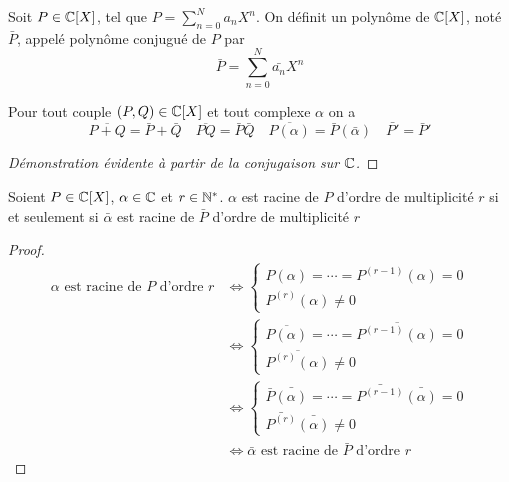 \begin{defdef}
  Soit \(P \in \mathbb{C}[X]\), tel que \(P = \sum_{n = 0}^N a_n X^n\). On définit un
  polynôme de \(\mathbb{C}[X]\), noté \(\bar{P}\), appelé polynôme conjugué de \(P\) par
  \begin{equation}
    \bar{P} = \sum_{n = 0}^N \bar{a_n} X^n
  \end{equation}
\end{defdef}

\begin{prop}
  Pour tout couple \((P,Q) \in \mathbb{C}[X]\) et tout complexe \(\alpha\) on a
  \begin{equation}
    \overline{P+Q} = \bar{P}+\bar{Q} \quad \overline{PQ} = \bar{P}\bar{Q} \quad
    \overline{P(\alpha)} = \bar{P}(\bar{\alpha}) \quad \bar{P'} = \bar{P}'
  \end{equation}
\end{prop}
\begin{proof}[Démonstration évidente à partir de la conjugaison sur \(\mathbb{C}\)]
\end{proof}

\begin{prop}
  Soient \(P \in \mathbb{C}[X]\), \( \alpha \in \mathbb{C}\) et \(r \in \mathbb{N}^*\). \(\alpha\) est
  racine de \(P\) d'ordre de multiplicité \(r\) si et seulement si
  \(\bar{\alpha}\) est racine de \(\bar{P}\) d'ordre de multiplicité \(r\)
\end{prop}
\begin{proof}
  \begin{align}
    \alpha \text{~est racine de~} P \text{~d'ordre~} r &\iff
    \begin{cases}
      P(\alpha) = \cdots = P^{(r-1)}(\alpha) = 0\\
      P^{(r)}(\alpha)\neq 0
    \end{cases}\\
    &\iff \begin{cases}
      \overline{P(\alpha)} = \cdots = \overline{P^{(r-1)}(\alpha)} = 0\\
      \overline{P^{(r)}(\alpha)}\neq 0
    \end{cases}\\
    &\iff \begin{cases}
      \bar{P}\bar{(\alpha)} = \cdots = \bar{P^{(r-1)}}\bar{(\alpha)} = 0\\
      \bar{P^{(r)}}\bar{(\alpha)}\neq 0
    \end{cases}\\
    &\iff \bar{\alpha} \text{~est racine de~} \bar{P} \text{~d'ordre~} r
  \end{align}
\end{proof}

